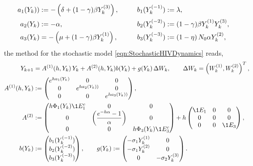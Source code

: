 	
	\begin{align}
		a_{1}(Y_k)) &:= 
			-\left(
				\delta + (1 - \gamma) \beta Y_k^{(3)}
			\right),		
			& b_1(Y_k^{(-1)}) &:= \lambda, 
			& 
		\notag
		\\
		a_{2}(Y_k) &:= -\alpha,
			&b_2(Y_k^{(-2)}) & :=
			(1-\gamma) \beta Y_{k}^{(1)} Y_{k}^{(3)},
		\notag
		\\
		a_{3}(Y_k) &= 
		-
		\left(
			\mu + (1- \gamma) \beta Y_{k}^{(1)}
		\right),
		\qquad
		&b_{3}(Y_k^{(-3)}) &:= 
		\left(
			1 - \eta 
		\right)
		N_0 \alpha Y_{k}^{(2)},
		\notag			
	\end{align}
	 the \SM method for the stochastic model \eqref{eqn:StochasticHIVDynamics} reads,
	\begin{align}
		Y_{k+1} &= A^{(1)}(h,Y_k) \,Y_k + A^{(2)}(h,Y_k)b(Y_k)+ g(Y_k)\, \Delta W_k,
		\qquad \Delta W_k = \left(W_k^{(1)}, W_k^{(2)}\right)^T, 
		\notag\\ 
		A^{(1)}(h,Y_k)&:=
		\begin{pmatrix}
		e^{ha_1(Y_k)}	&	0	&0 \\
		0	&e^{ha_2(Y_k))}	&0\\
		0	&0				&e^{ha_3(Y_k))}
	\end{pmatrix},
%	
	\notag
	\\
	A^{(2)}&:=
	\begin{pmatrix}
		h \Phi_1(Y_k)\1{E_1^c}	&0	&0\\
		0 & 
			\left(\displaystyle
					\frac{e^{-h\alpha} - 1}{\alpha}
			\right) & 0\\
		0 & 0 & h \Phi_3(Y_k)\1{E_3^c} 
	\end{pmatrix}
	+h
	\begin{pmatrix}
		\1{E_1}	&0 			&0\\
		0		&0			&0\\
		0		&0			&\1{E_3}\\
	\end{pmatrix},
	\notag
	\\
	b(Y_k) &:=
	\begin{pmatrix}
		b_1(Y_k^{(-1)})\\
		b_2(Y_k^{(-2)})\\
		b_3(Y_k^{(-3)})
	\end{pmatrix},
	\qquad
	g(Y_k):=
	\begin{pmatrix}
		-\sigma_1 Y_k^{(1)}	&0\\
		-\sigma_1 Y_k^{(2)}	&0\\
		0	&-\sigma_2 Y_k^{(3)}
	\end{pmatrix}.
\end{align}
	
